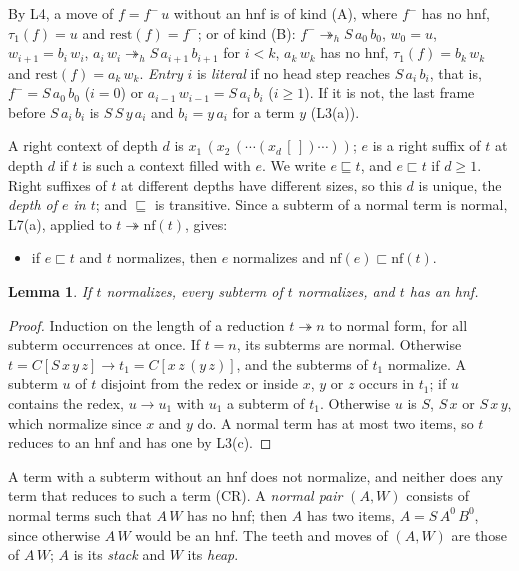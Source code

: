 \documentclass[11pt]{amsart}
\newtheorem{lemma}[theorem]{Lemma}
\theoremstyle{definition}
\newcommand{\red}{\twoheadrightarrow}
\newcommand{\hred}{\twoheadrightarrow_h}
\newcommand{\rest}{\mathrm{rest}}
\newcommand{\nf}{\mathrm{nf}}
\newcommand{\sqs}{\sqsubseteq}
\newcommand{\psq}{\sqsubset}
\begin{document}
By L4, a move of $f=f^-\,u$ without an hnf is of kind (A),
where $f^-$ has no hnf, $\tau_1(f)=u$ and $\rest(f)=f^-$; or of kind (B): $f^-\hred S\,a_0\,b_0$,
$w_0=u$, $w_{i+1}=b_i\,w_i$, $a_i\,w_i\hred S\,a_{i+1}\,b_{i+1}$ for $i<k$, $a_k\,w_k$ has no hnf,
$\tau_1(f)=b_k\,w_k$ and $\rest(f)=a_k\,w_k$. \emph{Entry} $i$ is \emph{literal} if no head step
reaches $S\,a_i\,b_i$, that is, $f^-=S\,a_0\,b_0$ ($i=0$) or
$a_{i-1}\,w_{i-1}=S\,a_i\,b_i$ ($i\ge1$). If it is not, the last frame before $S\,a_i\,b_i$ is
$S\,S\,y\,a_i$ and $b_i=y\,a_i$ for a term $y$ (L3(a)).

A right context of depth $d$ is $x_1\,(x_2\,(\cdots(x_d\,[\,])\cdots))$; $e$ is a right suffix of $t$
at depth $d$ if $t$ is such a context filled with $e$. We write $e\sqs t$, and $e\psq t$ if
$d\ge1$. Right suffixes of $t$ at different depths have different sizes, so this $d$ is unique, the
\emph{depth of $e$ in $t$}; and $\sqs$ is transitive. Since a subterm of a normal term is normal, L7(a), applied to $t\red\nf(t)$, gives:
\begin{itemize}
\item[(RS)] if $e\psq t$ and $t$ normalizes, then $e$ normalizes and $\nf(e)\psq\nf(t)$.
\end{itemize}

\begin{lemma}\label{lem:sub}
If $t$ normalizes, every subterm of $t$ normalizes, and $t$ has an hnf.
\end{lemma}

\begin{proof}
Induction on the length of a reduction $t\red n$ to normal form, for all subterm occurrences at
once. If $t=n$, its subterms are normal. Otherwise $t=C[S\,x\,y\,z]\to t_1=C[x\,z\,(y\,z)]$, and
the subterms of $t_1$ normalize. A subterm $u$ of $t$ disjoint from the redex or inside $x$, $y$ or
$z$ occurs in $t_1$; if $u$ contains the redex, $u\to u_1$ with $u_1$ a subterm of $t_1$. Otherwise
$u$ is $S$, $S\,x$ or $S\,x\,y$, which normalize since $x$ and $y$ do. A normal term has at most two
items, so $t$ reduces to an hnf and has one by L3(c).
\end{proof}

A term with a subterm without an hnf does not normalize, and neither does any term that reduces
to such a term (CR). A \emph{normal pair} $(A,W)$ consists of normal terms such that $A\,W$ has no hnf; then $A$
has two items, $A=S\,A^0\,B^0$, since otherwise $A\,W$ would be an hnf. The teeth and moves of
$(A,W)$ are those of $A\,W$; $A$ is its \emph{stack} and $W$ its \emph{heap}.
\end{document}
